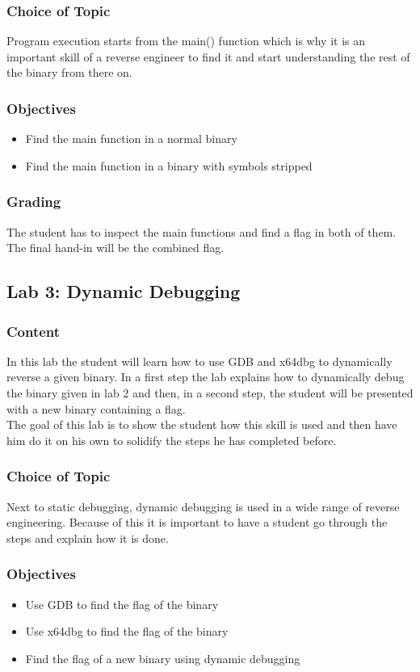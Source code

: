 \subsubsection*{Choice of Topic}
Program execution starts from the main() function which is why it is an important skill of a reverse engineer to find it and start understanding the rest of the binary from there on.
\subsubsection*{Objectives}
\begin{itemize}
    \item Find the main function in a normal binary
    \item Find the main function in a binary with symbols stripped
\end{itemize}
\subsubsection*{Grading}
The student has to inspect the main functions and find a flag in both of them. The final hand-in will be the combined flag.


\subsection{Lab 3: Dynamic Debugging}
\subsubsection*{Content}
In this lab the student will learn how to use GDB and x64dbg to dynamically reverse a given binary. In a first step the lab explains how to dynamically debug the binary given in lab 2 and then, in a second step, the student will be presented with a new binary containing a flag. \\
The goal of this lab is to show the student how this skill is used and then have him do it on his own to solidify the steps he has completed before.
\subsubsection*{Choice of Topic}
Next to static debugging, dynamic debugging is used in a wide range of reverse engineering. Because of this it is important to have a student go through the steps and explain how it is done. 
\subsubsection*{Objectives}
\begin{itemize}
    \item Use GDB to find the flag of the binary
    \item Use x64dbg to find the flag of the binary
    \item Find the flag of a new binary using dynamic debugging
\end{itemize}
